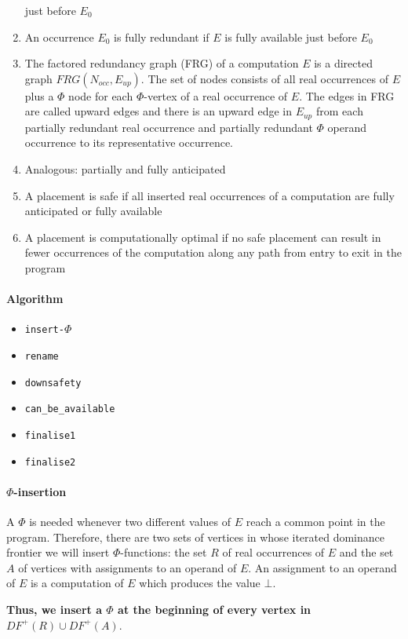 \documentclass[a4paper,12pt, notitlepage]{article}
\begin{document}
\begin{enumerate}
just before $E_0$
\item An occurrence $E_0$ is fully redundant if $E$ is fully available
just before $E_0$
\item The factored redundancy graph (FRG) of a computation $E$ is a directed
graph $FRG(N_{occ}, E_{up})$. The set of nodes consists of all real occurrences
of $E$ plus a $\Phi$ node for each $\Phi$-vertex of a real occurrence of $E$.
The edges in FRG are called upward edges and there is an upward edge in $E_{up}$
from each partially redundant real occurrence and partially redundant $\Phi$
operand occurrence to its representative occurrence.
\item Analogous: partially and fully anticipated
\item A placement is safe if all inserted real occurrences of a computation are
fully anticipated or fully available
\item A placement is computationally optimal if no safe placement can result in
fewer occurrences of the computation along any path from entry to exit in the
program
\end{enumerate}

\paragraph*{Algorithm} 
\begin{itemize}
\item \texttt{insert-$\Phi$}
\item \texttt{rename}
\item \texttt{downsafety}
\item \texttt{can\_be\_available}
\item \texttt{finalise1}
\item \texttt{finalise2}
\end{itemize}
\paragraph*{$\Phi$-insertion}
A $\Phi$ is needed whenever two different values of $E$ reach a common point in
the program. Therefore, there are two sets of vertices in whose iterated
dominance frontier we will insert $\Phi$-functions: the set $R$ of real
occurrences of $E$ and the set $A$ of vertices with assignments to an operand of
$E$. An assignment to an operand of $E$ is a computation of $E$ which produces
the value $\bot$. 

\textbf{Thus, we insert a $\Phi$ at the beginning of every vertex in
$DF^+(R) \cup DF^+(A)$}.
\end{document}
